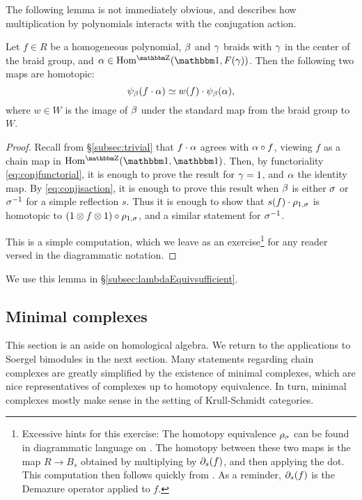 The following lemma is not immediately obvious, and describes how multiplication by polynomials interacts with the conjugation action.

\begin{lemma} \label{lem:howtoconj} Let $f \in R$ be a homogeneous polynomial, $\beta$ and $\gamma$ braids with $\gamma$ in the center of the braid group, and $\a \in \Homg(\one,F(\g))$. Then the following two maps are homotopic:
\begin{equation}\label{eq:conjugation1}
\psi_\beta(f \cdot \alpha) \simeq w(f) \cdot \psi_\beta(\alpha),
\end{equation}
where $w \in W$ is the image of $\beta$ under the standard map from the braid group to $W$. \end{lemma}

\begin{proof} Recall from \S\ref{subsec:trivial} that $f \cdot \alpha$ agrees with $\alpha \circ f$, viewing $f$ as a chain map in $\Homg(\one,\one)$. Then, by functoriality
\eqref{eq:conjfunctorial}, it is enough to prove the result for $\gamma = 1$, and $\alpha$ the identity map. By \eqref{eq:conjisaction}, it is enough to prove this result when $\beta$ is either
$\sigma$ or $\sigma^{-1}$ for a simple reflection $s$. Thus it is enough to show that $s(f) \cdot \rho_{1,\sigma}$ is homotopic to $(1 \otimes f \otimes 1) \circ \rho_{1,\sigma}$, and a similar statement
for $\sigma^{-1}$.

This is a simple computation, which we leave as an exercise\footnote{Excessive hints for this exercise: The homotopy equivalence $\rho_\sigma$ can be found in diagrammatic language on
\cite[page 18, move 1a]{EKra}. The homotopy between these two maps is the map $R \to B_s$ obtained by multiplying by $\partial_s(f)$, and then applying the dot. This computation then follows
quickly from \cite[Equation 5.2]{EWsoergelCalc}. As a reminder, $\partial_s(f)$ is the Demazure operator applied to $f$.} for any reader versed in the diagrammatic notation. \end{proof}

We use this lemma in \S\ref{subsec:lambdaEquivsufficient}.

\subsection{Minimal complexes}
\label{subsec:minimal}

This section is an aside on homological algebra. We return to the applications to Soergel bimodules in the next section.  Many statements regarding chain complexes are greatly simplified by the existence of minimal complexes, which are nice representatives of complexes up to homotopy equivalence.  In turn, minimal complexes mostly make sense in the setting of Krull-Schmidt categories.


